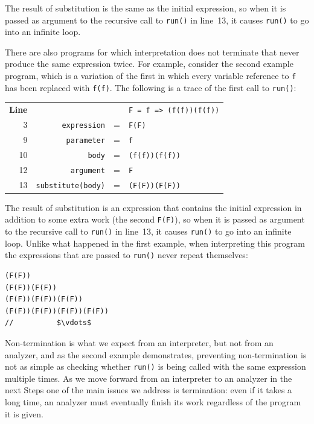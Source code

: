 \documentclass[12pt, oneside]{book}
\begin{document}
The result of substitution is the same as the initial expression, so when it is passed as argument to the recursive call to \texttt{run()} in line~13, it causes \texttt{run()} to go into an infinite loop.

There are also programs for which interpretation does not terminate that never produce the same expression twice. For example, consider the second example program, which is a variation of the first in which every variable reference to \texttt{f} has been replaced with \texttt{f(f)}. The following is a trace of the first call to \texttt{run()}:

\begin{center}
\begin{tabular}{rrcl}
\textbf{Line}&&&\texttt{F = f => (f(f))(f(f))}\\
3 & \texttt{expression} & = & \texttt{F(F)}\\
9 & \texttt{parameter} & = & \texttt{f}\\
10 & \texttt{body} & = & \texttt{(f(f))(f(f))}\\
12 & \texttt{argument} & = & \texttt{F}\\
13 & \texttt{substitute(body)} & = & \texttt{(F(F))(F(F))}\\
\end{tabular}
\end{center}

The result of substitution is an expression that contains the initial expression in addition to some extra work (the second \texttt{F(F)}), so when it is passed as argument to the recursive call to \texttt{run()} in line~13, it causes \texttt{run()} to go into an infinite loop. Unlike what happened in the first example, when interpreting this program the expressions that are passed to \texttt{run()} never repeat themselves:

\begin{verbatim}
(F(F))
(F(F))(F(F))
(F(F))(F(F))(F(F))
(F(F))(F(F))(F(F))(F(F))
//          $\vdots$
\end{verbatim}

Non-termination is what we expect from an interpreter, but not from an analyzer, and as the second example demonstrates, preventing non-termination is not as simple as checking whether \texttt{run()} is being called with the same expression multiple times. As we move forward from an interpreter to an analyzer in the next Steps one of the main issues we address is termination: even if it takes a long time, an analyzer must eventually finish its work regardless of the program it is given.
\end{document}
